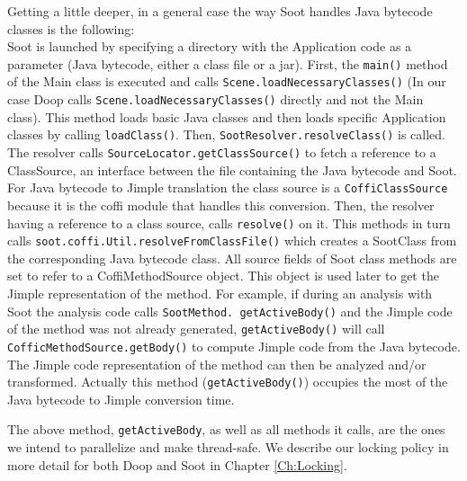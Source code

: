 \documentclass{dithesis}
\begin{document}
        Getting a little deeper, in a general case the way Soot handles Java bytecode classes is the following: \\
        Soot is launched by specifying a directory with the Application code as a parameter (Java bytecode, either a class file or a jar). First, the \texttt{main()} method of the Main class is executed and calls \texttt{Scene.loadNecessaryClasses()} (In our case Doop calls \texttt{Scene.loadNecessaryClasses()} directly and not the Main class). This method loads basic Java classes and then loads specific Application classes by calling \texttt{loadClass()}. Then, \texttt{SootResolver.resolveClass()} is called. The resolver calls \texttt{SourceLocator.getClassSource()} to fetch a reference to a ClassSource, an interface between the file containing the Java bytecode and Soot. For Java bytecode to Jimple translation the class source is a \texttt{CoffiClassSource} because it is the coffi module that handles this conversion. Then, the resolver having a reference to a class source, calls \texttt{resolve()} on it. This methods in turn calls \texttt{soot.coffi.Util.resolveFromClassFile()} which creates a SootClass from the corresponding Java bytecode class. All source fields of Soot class methods are set to refer to a CoffiMethodSource object. This object is used later to get the Jimple representation of the method. For example, if during an analysis with Soot the analysis code calls \texttt{SootMethod. getActiveBody()} and the Jimple code of the method was not already generated,       \texttt{getActiveBody()} will call \texttt{CofficMethodSource.getBody()} to compute Jimple code from the Java bytecode. The Jimple code representation of the method can then be analyzed and/or transformed. Actually this method (\texttt{getActiveBody()}) occupies the most of the Java bytecode to Jimple conversion time. 

        The above method, \texttt{getActiveBody}, as well as all methods it calls, are the ones we intend to parallelize and make thread-safe. We describe our locking policy in more detail for both Doop and Soot in Chapter \ref{Ch:Locking}. 


\end{document}
